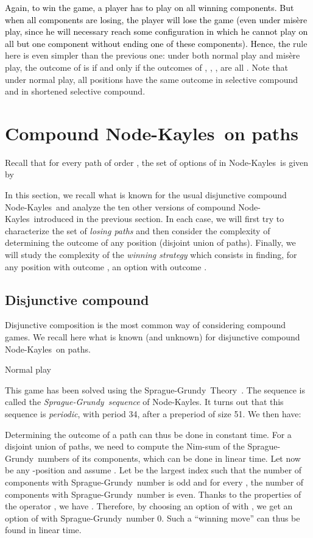 \documentclass[11pt]{article}
\newcommand{\modif}[1]{\textcolor{black}{#1}}
\newcommand{\NK}{Node-Kayles}
\newcommand{\SP}{Sprague-Grundy}
\begin{document}
\vskip 4mm

\modif{Again, to win the game, a player
has to play on all winning components. But when
all components are losing, the player will lose
the game (even under mis\`ere play, since he will
necessary reach some configuration in which he cannot
play on all but one component without ending one
of these components).
Hence,
the} rule here is even simpler than the previous one:
under both normal play and mis\`ere play, 
the outcome of  is  if and only if the
outcomes of , , ,  are all .
Note that under normal play, all positions have the same outcome
in selective compound and in shortened selective compound.

\section{Compound \NK\ on paths}
\label{sec:variations}

Recall that for every path  of order , the set of
options of  in \NK\ is given by

In this section, we recall what is known for the usual disjunctive
compound \NK\
and analyze the ten other versions of compound \NK\ introduced in
the previous section. In each case, we will first try to characterize
the set  of {\em losing paths}
and then consider the complexity of determining the
outcome of any position (disjoint union of paths).
Finally, we will study the complexity of the {\em winning strategy} which
consists in finding, for any position 
with outcome
, an option with outcome .

\subsection{Disjunctive compound}
\label{sec:disjunctive}

Disjunctive composition is the most common way of considering
compound games. We recall here what is known (and unknown) for
disjunctive compound \NK\ on paths.

\vskip 4mm

\begin{center}{\sc Normal play}\end{center}
This game has been solved using the \SP\ Theory~\cite[Chapter 4]{WW}.
The sequence 
is called the {\em \SP\ sequence} of \NK.
It turns out that this sequence is {\em periodic},
with period 34, after a preperiod of size 51.
We then have:

Determining the outcome of a path can thus be done in constant time.
For a disjoint union of paths, we need to compute the Nim-sum of the
\SP\ numbers of its components, which can be done in linear time.
Let now  be any -position
and assume .
Let  be the largest index such that
 the number of components with \SP\ number  is
odd and  for every ,  
the number of components with \SP\ number  is even.
Thanks to the properties of the operator , we have
.
Therefore, by choosing an option  of  with
,
we get an option of  with \SP\ number 0.
Such a ``winning move'' can thus be found in linear time. 
\end{document}
